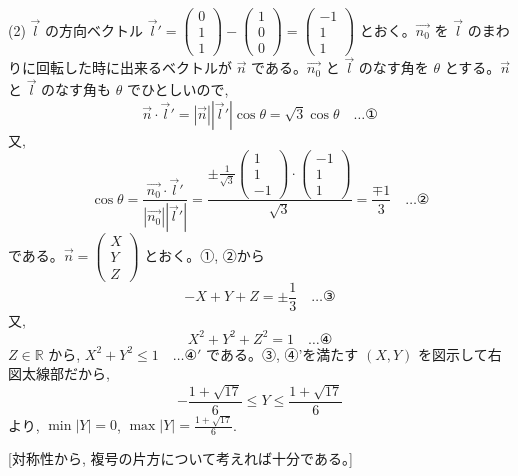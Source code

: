 \documentclass[../main.tex]{subfiles}
\begin{document}
(2)
$\vec{l}$ の方向ベクトル $\vec{l}' =
\begin{pmatrix} 0 \\ 1 \\ 1
\end{pmatrix} -
\begin{pmatrix} 1 \\ 0 \\ 0
\end{pmatrix} =
\begin{pmatrix} -1 \\ 1 \\ 1
\end{pmatrix}$ とおく。$\vec{n_0}$ を $\vec{l}$ のまわりに回転した時に出来るベクトルが $\vec{n}$ である。$\vec{n_0}$ と $\vec{l}$ のなす角を $\theta$ とする。$\vec{n}$ と $\vec{l}$ のなす角も $\theta$ でひとしいので,
\[
  \vec{n} \cdot \vec{l}' = |\vec{n}||\vec{l}'|\cos\theta = \sqrt{3}\cos\theta \quad \dots \text{①}
\]
又,
\[
  \cos\theta = \frac{\vec{n_0} \cdot \vec{l}'}{|\vec{n_0}||\vec{l}'|} = \frac{\pm \frac{1}{\sqrt{3}}
    \begin{pmatrix} 1 \\ 1 \\ -1
    \end{pmatrix} \cdot
    \begin{pmatrix} -1 \\ 1 \\ 1
  \end{pmatrix}}{\sqrt{3}} = \frac{\mp 1}{3} \quad \dots \text{②}
\]
である。$\vec{n} =
\begin{pmatrix} X \\ Y \\ Z
\end{pmatrix}$ とおく。①, ②から
\[
  -X + Y + Z = \pm \frac{1}{3} \quad \dots \text{③}
\]
又,
\[
  X^2 + Y^2 + Z^2 = 1 \quad \dots \text{④}
\]
$Z \in \mathbb{R}$ から, $X^2 + Y^2 \le 1 \quad \dots \text{④}'$ である。③, ④'を満たす $(X, Y)$ を図示して右図太線部だから,
\[
  -\frac{1+\sqrt{17}}{6} \le Y \le \frac{1+\sqrt{17}}{6}
\]
より, $\min |Y| = 0$, $\max |Y| = \frac{1+\sqrt{17}}{6}$.

[対称性から, 複号の片方について考えれば十分である。]
\end{document}
